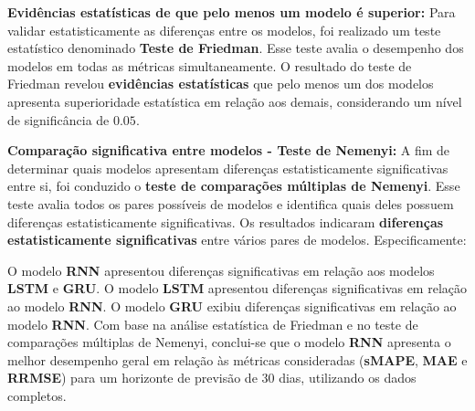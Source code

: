 \noindent\textbf{Evidências estatísticas de que pelo menos um modelo é superior:}
Para validar estatisticamente as diferenças entre os modelos, foi realizado um teste estatístico denominado \textbf{Teste de Friedman}. Esse teste avalia o desempenho dos modelos em todas as métricas simultaneamente. O resultado do teste de Friedman revelou \textbf{evidências estatísticas} que pelo menos um dos modelos apresenta superioridade estatística em relação aos demais, considerando um nível de significância de $0.05$.
	
\noindent\textbf{Comparação significativa entre modelos - Teste de Nemenyi:}	
A fim de determinar quais modelos apresentam diferenças estatisticamente significativas entre si, foi conduzido o \textbf{teste de comparações múltiplas de Nemenyi}. Esse teste avalia todos os pares possíveis de modelos e identifica quais deles possuem diferenças estatisticamente significativas. Os resultados indicaram \textbf{diferenças estatisticamente significativas} entre vários pares de modelos. Especificamente:

O modelo \textbf{RNN} apresentou diferenças significativas em relação aos modelos \textbf{LSTM} e \textbf{GRU}.
O modelo \textbf{LSTM} apresentou diferenças significativas em relação ao modelo \textbf{RNN}.
O modelo \textbf{GRU} exibiu diferenças significativas em relação ao modelo \textbf{RNN}.
Com base na análise estatística de Friedman e no teste de comparações múltiplas de Nemenyi, conclui-se que o modelo \textbf{RNN} apresenta o melhor desempenho geral em relação às métricas consideradas (\textbf{sMAPE}, \textbf{MAE} e \textbf{RRMSE}) para um horizonte de previsão de 30 dias, utilizando os dados completos.


